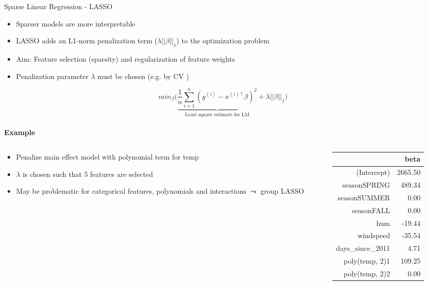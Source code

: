 \documentclass[11pt,compress,t,notes=noshow, aspectratio=169, xcolor=table]{beamer}
\begin{document}
\begin{frame}{Sparse Linear Regression - LASSO }
\begin{itemize}
    \item Sparser models are more interpretable
    \item LASSO adds an L1-norm penalization term  ($\lambda||\beta||_1$) to the optimization problem
    \item Aim: Feature selection (sparsity) and regularization of feature weights
    \item Penalization parameter $\lambda$ must be chosen (e.g. by CV %
    )
\end{itemize}


$$
min_{\beta} \bigg(\underbrace{\frac{1}{n} \sum_{i=1}^{n} (y^{(i)} - x^{(i)\top}\beta)^2}_\text{Least square estimate for LM} + \lambda||\beta||_1\bigg)
$$
\vspace*{0.2cm}\\
\textbf{Example}
\vspace*{-0.4cm}
\pause
\begin{columns}
\begin{column}{0.65\textwidth}
\begin{itemize}
    \item Penalize main effect model with polynomial term for temp
    \item $\lambda$ is chosen such that 5 features are selected
    \item May be problematic for categorical features, polynomials and interactions $\leadsto$ group LASSO 
\end{itemize}
\end{column}
\begin{column}{0.35\textwidth}
\tiny
\begin{table}[ht]
\centering
\begin{tabular}{rr}
  \hline
 & beta \\ 
  \hline
(Intercept) & 2665.50 \\ 
  seasonSPRING & 489.34 \\ 
  seasonSUMMER & 0.00 \\ 
  seasonFALL & 0.00 \\ 
  hum & -19.44 \\ 
  windspeed & -35.54 \\ 
  days\_since\_2011 & 4.71 \\ 
  poly(temp, 2)1 & 109.25 \\ 
  poly(temp, 2)2 & 0.00 \\ 
   \hline
\end{tabular}
\end{table}
\end{column}
\end{columns}

\end{frame}
\end{document}
